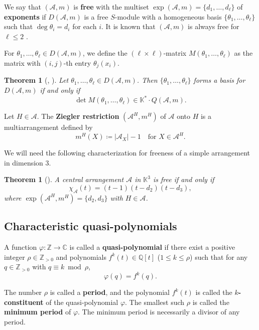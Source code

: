 \documentclass[11pt]{article}
\newtheorem{theorem}[theo]{Theorem}
\theoremstyle{definition}
\numberwithin{equation}{section}
\newcommand{\A}{\mathcal{A}}
\newcommand{\Z}{\mathbb{Z}}
\newcommand{\K}{\mathbb{K}}
\newcommand{\tbf}{\textbf}
\newcommand{\C}{\mathbb{C}}
\begin{document}
We say that $(\A, m)$  is \tbf{free}  with the multiset $ \exp(\A, m) = \{d_{1}, \dots, d_{\ell}\} $ of \textbf{exponents}  if $D(\A,m)$ is a free $S$-module with a homogeneous basis $ \{\theta_{1}, \dots, \theta_{\ell}\}$  such that $ \deg \theta_{i} = d_{i} $ for each $ i $. 
It is known that  $(\A, m)$ is always free for $\ell\le 2$ \cite[Corollary 7]{Z89}.

For $\theta_1, \ldots , \theta_\ell \in D(\A,m)$, we define the $(\ell \times\ell)$-matrix $M(\theta_1, \ldots , \theta_\ell)$ as the matrix with $(i,j)$-th entry $\theta_j(x_i)$. 
\begin{theorem}[{\cite[Theorem 4.19]{OT92}, \cite[Theorem 8]{Z89}}]
\label{thm:criterion}
Let $\theta_1, \ldots , \theta_\ell \in D(\A,m)$. Then $\{\theta_1, \ldots , \theta_\ell\}$ forms a basis for $D(\A,m)$ if and only if
$$\det M(\theta_1, \ldots , \theta_\ell) \in \K^* \cdot Q(\A,m).$$
\end{theorem}
 

Let $H \in \A$. The \tbf{Ziegler restriction} $(\A^H,m^H)$ of $\A$ onto $H$ is a multiarrangement defined by 
$$m^H(X) \coloneqq |\A_X|-1 \quad \mbox{for } X \in \A^H.$$ 

We will need the following characterization for freeness of a simple arrangement in dimension $3$. 
\begin{theorem}[{\cite[Corollary 3.3]{Yo05}}]
 \label{thm:Yo-3arr}
A central arrangement $ \mathcal{A}$ in $\mathbb{K}^3$ is free if and only if 
$$ \chi_{\mathcal{A}}(t) = (t-1)(t-d_2)(t-d_3),$$
where $\exp (\A^H, m^H)=\{d_2, d_3\}$ with $H \in \A$.
\end{theorem}


\subsection{Characteristic quasi-polynomials}
\label{subsec:characteristic-quasi}
A function $\varphi: \Z \to \C$ is called a \tbf{quasi-polynomial} if there exist a positive integer $\rho\in\Z_{>0}$ and polynomials $f^k(t)\in\mathbb{Q}[t]$ ($1 \le k \le \rho$) such that for any $q\in\Z_{>0}$ with  $q\equiv k\bmod \rho$, 
\begin{equation*}
\varphi(q) =f^k(q).
\end{equation*}

The number $\rho$ is called a \tbf{period}, and the polynomial $f^k(t)$ is called the \tbf{$k$-constituent} of the quasi-polynomial $\varphi$. 
The smallest such $\rho$ is called the \tbf{minimum period} of  $\varphi$. 
The minimum period is necessarily a divisor of any period. 
\end{document}

